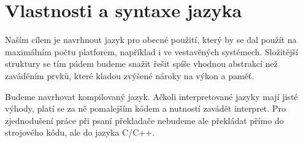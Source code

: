 \begin{comment}
Mou hlavní motivací je nespokojenost se stávajícími programovacími jazyky. Programování mám jako koníčka už od nějakých dvanácti let, a tak jsem ještě před nastoupením na FIT získal nějaké zkušenosti z psaní aplikací v Object Pascalu (Delphi), C++ (Qt, SDL + OpenGL) a PHP (webové aplikace). FIT pak můj repertoár (i když jen rámcově) rozšířil na valnou většinu dnes používaných jazyků. Bohužel jsem ale nenarazil na žádný, který by splňoval mé požadavky. Rozhodl jsem se tedy využít nutnost napsání bakalářské práce k~uskutečnění mého dlouholetého snu.

\paragraph{Jazyk D}
Mému srdci nejbližší jazyk, na který jsem ve svém pátrání narazil, byl jazyk D. Jedná se o kompilovaný jazyk vycházející z C++ (binárky jsou do jisté míry kompatibilní) s~velice podobnou syntaxí. Největší rozdíly jsou modulový systém\footnote{\url{http://dlang.org/spec/module.html}} (zdrojový kód je rozdělen do modulů, které se vzájemně, i rekurzivně, importují; odpadá nutnost psát hlavičkové soubory), značně rozšířená funkčnost metaprogramování s šablonami a~rozšířená schopnost vykonávat funkce za doby kompilace.

D mi byl velikou inspirací při navrhování mého jazyka. Bohužel i v D jsem narazil na strop možnosti (ačkoli byl značně výš než třeba v C++), kdy některé věci nešly napsat tak jednoduše, jak bych chtěl. Tento jazyk však dokazuje, že tato bariéra může být mnohem dál. Já ji chci ve svém jazyku ještě více posunout. 
\end{comment}

\chapter{Vlastnosti a syntaxe jazyka} \label{chap:languageProps}
Naším cílem je navrhnout jazyk pro obecné použití, který by se dal použít na maximálním počtu platforem, například i ve vestavěných systémech. Složitější struktury se tím pádem budeme snažit řešit spíše vhodnou abstrakcí než zaváděním prvků, které kladou zvýšené nároky na výkon a paměť.

Budeme navrhovat kompilovaný jazyk. Ačkoli interpretované jazyky mají jisté výhody, platí se za ně pomalejším kódem a nutností zavádět interpret. Pro zjednodušení práce při psaní překladače nebudeme ale překládat přímo do strojového kódu, ale do jazyka C/C++.

